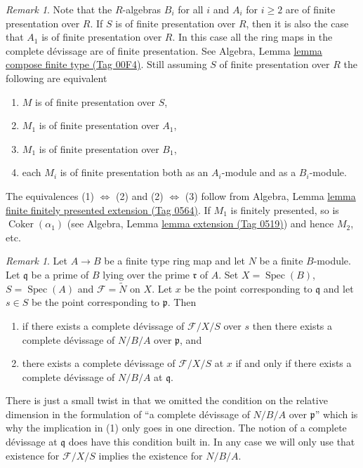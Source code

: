 \documentclass{amsart}
\theoremstyle{plain}
\theoremstyle{definition}
\theoremstyle{remark}
\newtheorem{remark}[subsection]{Remark}
\numberwithin{equation}{subsection}
\def\Spec{\mathop{\mathrm{Spec}}}
\def\Coker{\mathop{\mathrm{Coker}}}
\begin{document}
\begin{remark}
\label{remark-finite-presentation}
Note that the $R$-algebras $B_i$ for all $i$ and $A_i$ for $i \geq 2$
are of finite presentation over $R$. If $S$ is of finite presentation over
$R$, then it is also the case that $A_1$ is of finite presentation over
$R$. In this case all the ring maps in the complete d\'evissage are of
finite presentation. See
Algebra, Lemma \href{https://stacks.math.columbia.edu/tag/00F4}{lemma compose finite type (Tag 00F4)}.
Still assuming $S$ of finite presentation over $R$
the following are equivalent
\begin{enumerate}
\item $M$ is of finite presentation over $S$,
\item $M_1$ is of finite presentation over $A_1$,
\item $M_1$ is of finite presentation over $B_1$,
\item each $M_i$ is of finite presentation both as an $A_i$-module
and as a $B_i$-module.
\end{enumerate}
The equivalences (1) $\Leftrightarrow$ (2) and (2) $\Leftrightarrow$ (3)
follow from
Algebra, Lemma \href{https://stacks.math.columbia.edu/tag/0564}{lemma finite finitely presented extension (Tag 0564)}.
If $M_1$ is finitely presented, so is $\Coker(\alpha_1)$ (see
Algebra, Lemma \href{https://stacks.math.columbia.edu/tag/0519}{lemma extension (Tag 0519)})
and hence $M_2$, etc.
\end{remark}

\begin{remark}
\label{remark-same-notion}
Let $A \to B$ be a finite type ring map and let $N$ be a finite
$B$-module. Let $\mathfrak q$ be a prime of $B$ lying over the prime
$\mathfrak r$ of $A$. Set $X = \Spec(B)$, $S = \Spec(A)$ and
$\mathcal{F} = \widetilde{N}$ on $X$. Let $x$ be the point corresponding
to $\mathfrak q$ and let $s \in S$ be the point corresponding to
$\mathfrak p$. Then
\begin{enumerate}
\item if there exists a complete d\'evissage of $\mathcal{F}/X/S$
over $s$ then there exists a complete d\'evissage of
$N/B/A$ over $\mathfrak p$, and
\item there exists a complete d\'evissage of $\mathcal{F}/X/S$
at $x$ if and only if there exists a complete d\'evissage of
$N/B/A$ at $\mathfrak q$.
\end{enumerate}
There is just a small twist in that we omitted the condition on
the relative dimension in the formulation of ``a complete d\'evissage of
$N/B/A$ over $\mathfrak p$'' which is why the implication in (1)
only goes in one direction.
The notion of a complete d\'evissage at
$\mathfrak q$ does have this condition built in. In any case we will
only use that existence for $\mathcal{F}/X/S$
implies the existence for $N/B/A$.
\end{remark}
\end{document}
